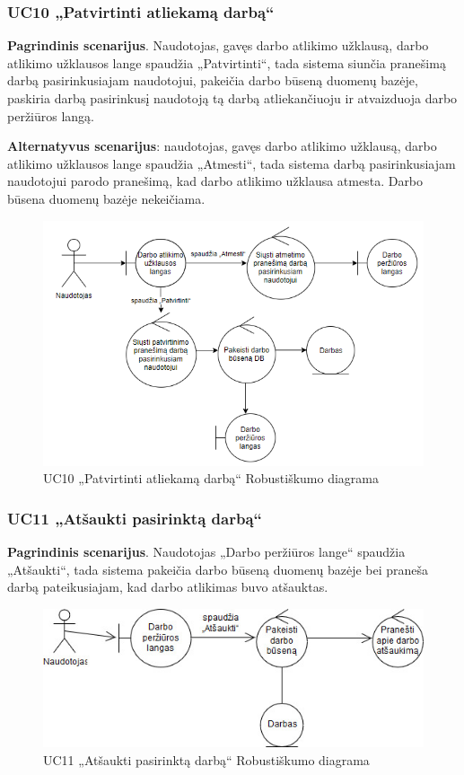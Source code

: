 \documentclass{VUMIFPSbakalaurinis}
\begin{document}
\subsubsection{UC10 „Patvirtinti atliekamą darbą“}
\textbf{Pagrindinis scenarijus}. Naudotojas, gavęs darbo atlikimo užklausą, darbo atlikimo užklausos lange spaudžia „Patvirtinti“, tada sistema siunčia pranešimą darbą pasirinkusiajam naudotojui, pakeičia darbo būseną duomenų bazėje, paskiria darbą pasirinkusį naudotoją tą darbą atliekančiuoju ir atvaizduoja darbo peržiūros langą. 
\par \textbf{Alternatyvus scenarijus}: naudotojas, gavęs darbo atlikimo užklausą, darbo atlikimo užklausos lange spaudžia „Atmesti“, tada sistema darbą pasirinkusiajam naudotojui parodo pranešimą, kad darbo atlikimo užklausa atmesta. Darbo būsena duomenų bazėje nekeičiama.

\begin{figure}[H]
	\centering
	\includegraphics[scale=0.6]{img/Robustness/UC10}
	\caption{UC10 „Patvirtinti atliekamą darbą“ Robustiškumo diagrama}
	\label{img:uc10rob}
\end{figure}

\subsubsection{UC11 „Atšaukti pasirinktą darbą“}
\textbf{Pagrindinis scenarijus}. Naudotojas „Darbo peržiūros lange“ spaudžia „Atšaukti“, tada sistema pakeičia darbo būseną duomenų bazėje bei praneša darbą pateikusiajam, kad darbo atlikimas buvo atšauktas.

\begin{figure}[H]
	\centering
	\includegraphics[scale=0.6]{img/Robustness/UC11}
	\caption{UC11 „Atšaukti pasirinktą darbą“ Robustiškumo diagrama}
	\label{img:uc11rob}
\end{figure}
\end{document}
